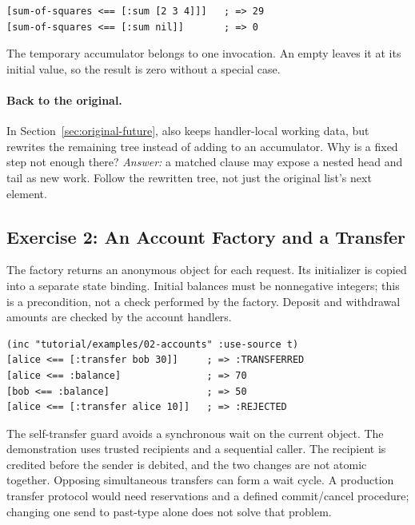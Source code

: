 \begin{lstlisting}
[sum-of-squares <== [:sum [2 3 4]]]   ; => 29
[sum-of-squares <== [:sum nil]]       ; => 0
\end{lstlisting}

The temporary accumulator belongs to one invocation.
An empty  leaves it at its initial value, so the result
is zero without a special case.

\paragraph{Back to the original.}
In Section~\ref{sec:original-future},  also keeps
handler-local working data, but rewrites the remaining tree instead of
adding to an accumulator. Why is a fixed  step not enough there?
\emph{Answer:} a matched clause may expose a nested head and tail as new
work. Follow the rewritten tree, not just the original list's next element.

\subsection{Exercise 2: An Account Factory and a Transfer}
\label{sol:transfer}

The factory returns an anonymous object for each  request.
Its initializer is copied into a separate state binding.
Initial balances must be nonnegative integers; this is a precondition,
not a check performed by the factory. Deposit and withdrawal amounts
are checked by the account handlers.


\begin{lstlisting}
(inc "tutorial/examples/02-accounts" :use-source t)
[alice <== [:transfer bob 30]]     ; => :TRANSFERRED
[alice <== :balance]               ; => 70
[bob <== :balance]                 ; => 50
[alice <== [:transfer alice 10]]   ; => :REJECTED
\end{lstlisting}

The self-transfer guard avoids a synchronous wait on the current object.
The demonstration uses trusted recipients and a sequential caller.
The recipient is credited before the sender is debited, and the two
changes are not atomic together. Opposing simultaneous transfers can
form a wait cycle. A production transfer protocol would need reservations
and a defined commit/cancel procedure; changing one send to past-type
alone does not solve that problem.

